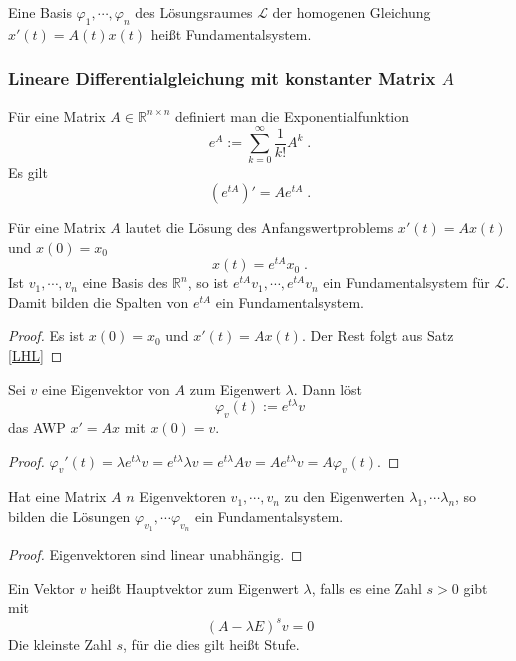 \begin{Definition}
Eine Basis  $\varphi_1, \cdots, \varphi_n$ des Lösungsraumes $\mathcal{L}$ der homogenen Gleichung $x'(t) = A(t)x(t)$ heißt Fundamentalsystem.
\end{Definition}

\subsubsection{Lineare Differentialgleichung mit konstanter Matrix $A$}

\begin{Definition}
Für eine Matrix $A \in \mathbb{R}^{n \times n}$ definiert man die Exponentialfunktion 
$$  e^{ A}  := \sum_{k= 0}^{\infty} \frac{1}{k!} A^k \; .$$
Es gilt  
$$  (e^{ tA})' = A e^{tA}  \; .$$
\end{Definition}


\begin{Satz}
Für eine Matrix $A$ lautet die Lösung des Anfangswertproblems $x'(t) = Ax(t)$ und $x(0) = x_0$
$$ x(t) = e^{tA} x_0 \;.$$ Ist $v_1, \cdots , v_n$ eine Basis des $\mathbb{R}^n$, so ist $e^{tA}v_1, \cdots , e^{tA}v_n$ ein Fundamentalsystem für $\mathcal{L}$. Damit bilden die Spalten von  $e^{tA}$ ein Fundamentalsystem.
\end{Satz}
\begin{proof}
Es ist $x(0) = x_0$ und $x'(t)= A x(t)$. Der Rest folgt aus Satz  \ref{LHL}
\end{proof}

\begin{Lemma}
Sei $v$ eine Eigenvektor von $A$ zum Eigenwert $\lambda$. Dann löst 
$$ \varphi_v(t) := e^{t \lambda} v$$ das AWP $x' = Ax$ mit $x(0) = v$.
\end{Lemma}
\begin{proof}
$\varphi_v'(t) =  \lambda  e^{t \lambda}  v =  e^{t\lambda}  \lambda v =  e^{t\lambda}  A v  = A e^{t\lambda}   v  = A  \varphi_v(t)$.
\end{proof}

\begin{Lemma}
Hat eine Matrix $A$ $n$ Eigenvektoren $v_1, \cdots , v_n$ zu den Eigenwerten $\lambda_1, \cdots  \lambda_n$, 
so bilden die Lösungen $ \varphi_{v_1}, \cdots  \varphi_{v_n}$ ein Fundamentalsystem.
\end{Lemma}
\begin{proof}
Eigenvektoren sind linear unabhängig.
\end{proof}


\begin{Definition}
Ein Vektor $v$ heißt Hauptvektor zum Eigenwert $\lambda$, falls es eine Zahl $s>0$ gibt mit 
$$ (A - \lambda E)^s v = 0$$
Die kleinste Zahl $s$, für die dies gilt heißt Stufe.
\end{Definition}

